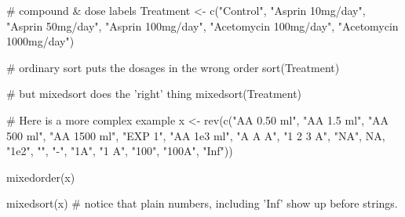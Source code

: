 \begin{Examples}
\begin{ExampleCode}
# compound & dose labels
Treatment <- c("Control", "Asprin 10mg/day", "Asprin 50mg/day",
               "Asprin 100mg/day", "Acetomycin 100mg/day",
               "Acetomycin 1000mg/day")

# ordinary sort puts the dosages in the wrong order
sort(Treatment)

# but mixedsort does the 'right' thing
mixedsort(Treatment)

# Here is a more complex example
x <- rev(c("AA 0.50 ml", "AA 1.5 ml", "AA 500 ml", "AA 1500 ml",
           "EXP 1", "AA 1e3 ml", "A A A", "1 2 3 A", "NA", NA, "1e2",
           "", "-", "1A", "1 A", "100", "100A", "Inf"))

mixedorder(x)

mixedsort(x)
# notice that plain numbers, including 'Inf' show up before strings.

\end{ExampleCode}
\end{Examples}

